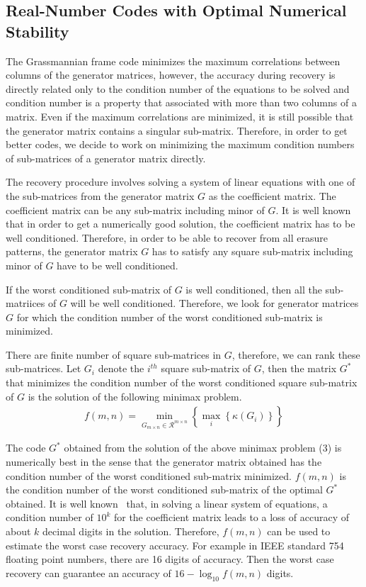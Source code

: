 \documentclass{sig-alternate}
\begin{document}
\subsection{Real-Number Codes with Optimal Numerical Stability}

The Grassmannian frame code minimizes the maximum correlations 
between columns of the generator matrices, however, the accuracy during recovery is 
directly related only to the condition number of the equations to be solved and condition number
is a property that associated with more than two columns of a matrix. 
Even if the maximum correlations are minimized, it is still possible 
that the generator matrix contains a singular sub-matrix. Therefore,
in order to get better codes, we decide to work on minimizing the maximum condition numbers
of sub-matrices of a generator matrix directly.

The recovery procedure involves solving a system of linear equations
with one of the sub-matrices from the generator matrix $G$ as the coefficient matrix. 
The coefficient matrix can be any sub-matrix including minor
of $G$. It is well known that in order to get a numerically good solution,
the coefficient matrix has to be well conditioned. Therefore, in order
to be able to recover from all erasure patterns, the generator matrix $G$
has to satisfy any square sub-matrix including minor of $G$ have to be well conditioned. 

If the worst conditioned sub-matrix of $G$ is well conditioned, 
then all the sub-matriices of $G$ will be well conditioned. 
Therefore, we look for generator matrices $G$ for which the 
condition number of the worst conditioned sub-matrix is minimized.  

There are finite number of square sub-matrices in $G$, therefore, we can rank 
these sub-matrices. Let $G_i$ denote the $i^{th}$ square sub-matrix of $G$, 
then the matrix $G^*$ that minimizes the condition number of the worst conditioned square sub-matrix of $G$
is the solution of the following minimax problem.
\begin{eqnarray} 
f(m,n)=\displaystyle \min_{ G_{m \times n} \in \mathcal{R}^{m \times n} }
\left\{  \displaystyle \max_{i} \left\{ \kappa (G_i) \right\}  \right\}
\end{eqnarray} 



The code $G^*$ obtained from the solution of the above minimax problem (3)
is numerically best in the sense that the generator matrix  obtained
has the condition number of the worst conditioned sub-matrix minimized. 
$f(m,n)$ is the condition number of the worst conditioned sub-matrix of the 
optimal $G^*$ obtained. It is well known~\cite{golub89:matrix} that, in solving 
a linear system of equations, a condition number of $10^k$ for the coefficient matrix
leads to a loss of accuracy of about $k$ decimal digits in the solution. 
Therefore, $f(m,n)$ can be used to estimate
the worst case recovery accuracy. For example in IEEE standard 754  
floating point numbers, there are 16 digits of accuracy. 
Then the worst case recovery can guarantee an accuracy 
of  $16 - \log_{10} f(m, n) $ digits. 
\end{document}
